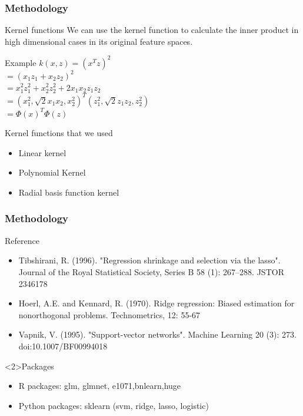 \documentclass{beamer}
\begin{document}
\begin{frame}
\frametitle{Methodology}
\begin{block}{Kernel functions}
We can use the kernel function to calculate the inner product in high dimensional cases in its original feature spaces.
\end{block}
\begin{block}{Example}
$k(x,z)=(x^Tz)^2$\\
$=(x_1z_1+x_2z_2)^2$\\
$=x_1^2z_1^2+x_2^2 z_2^2+2x_1x_2z_1z_2$\\
$=(x_1^2,\sqrt{2}x_1x_2,x_2^2)^T(z_1^2,\sqrt{2}z_1z_2,z_2^2)$\\
$=\Phi(x)^T\Phi(z)$\\
\end{block}
\begin{block}{Kernel functions that we used}
\begin{itemize}
        \item  Linear kernel\\
        \item  Polynomial Kernel\\
        \item  Radial basis function kernel\\
    \end{itemize}

\end{block}

\end{frame}

\begin{frame}
\frametitle{Methodology }
  \begin{block}{Reference}
   \begin{itemize}
        \item  Tibshirani, R. (1996). "Regression shrinkage and selection via the lasso". Journal of the Royal Statistical Society, Series B 58 (1): 267–288. JSTOR 2346178
        \item Hoerl, A.E. and Kennard, R. (1970). Ridge regression: Biased
estimation for nonorthogonal problems. Technometrics, 12:
55-67
        \item Vapnik, V. (1995). "Support-vector networks". Machine Learning 20 (3): 273. doi:10.1007/BF00994018
    \end{itemize}
  \end{block}

  \begin{block}<2>{Packages}
    \begin{itemize}
        \item  R packages: glm, glmnet, e1071,bnlearn,huge
        \item  Python packages: sklearn (svm, ridge, lasso, logistic)
    \end{itemize}
  \end{block}

\end{frame}
\end{document}
